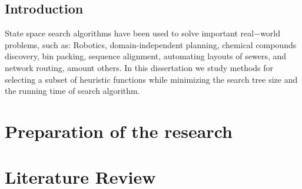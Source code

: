 \documentclass[
	12pt,				%
	openright,		nsubseteq	%
	twoside,			%
	a4paper,			%
	english,			%
	french,				%
	spanish,			%
	brazil				%
	]{abntex2}
\begin{document}
\tableofcontents*
\cleardoublepage



\textual

\chapter*[Introduction]{Introduction}

\noindent
State space search algorithms have been used to solve important real$-$world problems, such as: Robotics, domain-independent planning, chemical compounds discovery, bin packing, sequence alignment, automating layouts of sewers, and network routing, amount others. In this dissertation we study methods for selecting a subset of heuristic functions while minimizing the search tree size and the running time of search algorithm.

\part{Preparation of the research}


%

\part{Literature Review}

\end{document}
